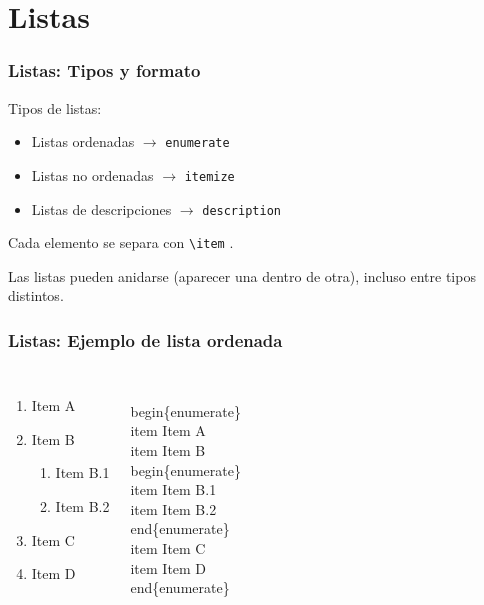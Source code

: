 \section{Listas}

\begin{frame}[fragile]
\frametitle{Listas: Tipos y formato}

Tipos de listas:
\begin{itemize}
 \item Listas ordenadas $\rightarrow$ \verb|enumerate|
 \item Listas no ordenadas $\rightarrow$ \verb|itemize|
 \item Listas de descripciones $\rightarrow$ \verb|description|
\end{itemize}

\vspace{0.5cm}

Cada elemento se separa con \verb|\item| .

\vspace{0.5cm}

Las listas pueden anidarse (aparecer una dentro de otra), incluso entre tipos distintos.
\end{frame}


\begin{frame}[fragile]
\frametitle{Listas: Ejemplo de lista ordenada}
\begin{columns}

    \begin{enumerate}
    \item Item A
    \item Item B
        \begin{enumerate}
            \item Item B.1
            \item Item B.2
        \end{enumerate}
    \item Item C
    \item Item D
    \end{enumerate}

\begin{semiverbatim}
\\begin\{enumerate\}
    \\item Item A
    \\item Item B
        \\begin\{enumerate\}
            \\item Item B.1
            \\item Item B.2
        \\end\{enumerate\}
    \\item Item C
    \\item Item D
\\end\{enumerate\}
\end{semiverbatim}
\end{columns}
\end{frame}


